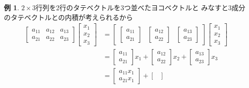 \documentclass[11pt, a4paper, dvipdfmx]{jsarticle}
\theoremstyle{definition}
\newtheorem{Example}[Axiom]{例}
\theoremstyle{mystyle}
\numberwithin{equation}{section} %
\begin{document}
\begin{Example}\label{ex-prod-vm}
    $2\times3$行列を2行のタテベクトルを3つ並べたヨコベクトルと
    みなすと3成分のタテベクトルとの内積が考えられるから
    \begin{align*}
        \begin{bmatrix}
            a_{11}&a_{12}&a_{13}\\
            a_{21}&a_{22}&a_{23}
        \end{bmatrix}
        \begin{bmatrix}
            x_1\\x_2\\x_3
        \end{bmatrix}
        &=\begin{bmatrix}
            \begin{bmatrix}
               a_{11}\\a_{21}
            \end{bmatrix}&\begin{bmatrix}
               a_{12}\\a_{22} 
            \end{bmatrix}&\begin{bmatrix}
               a_{13}\\a_{23}
            \end{bmatrix}   
        \end{bmatrix}
        \begin{bmatrix}
            x_1\\x_2\\x_3
        \end{bmatrix}\\
        &=\begin{bmatrix}
               a_{11}\\a_{21}
            \end{bmatrix}x_1+\begin{bmatrix}
               a_{12}\\a_{22} 
            \end{bmatrix}x_2+\begin{bmatrix}
               a_{13}\\a_{23}
            \end{bmatrix}x_3\\
        &=\begin{bmatrix}
                a_{11}x_1\\a_{21}x_1
        \end{bmatrix}+\begin{bmatrix}

\end{bmatrix}
\end{align*}
\end{Example}
\end{document}
